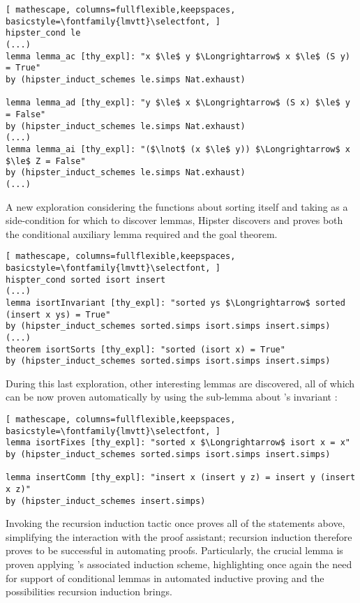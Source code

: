 \begin{lstlisting}[ mathescape, columns=fullflexible,keepspaces, basicstyle=\fontfamily{lmvtt}\selectfont, ]
hipster_cond le
(...)
lemma lemma_ac [thy_expl]: "x $\le$ y $\Longrightarrow$ x $\le$ (S y) = True"
by (hipster_induct_schemes le.simps Nat.exhaust)

lemma lemma_ad [thy_expl]: "y $\le$ x $\Longrightarrow$ (S x) $\le$ y = False"
by (hipster_induct_schemes le.simps Nat.exhaust)
(...)
lemma lemma_ai [thy_expl]: "($\lnot$ (x $\le$ y)) $\Longrightarrow$ x $\le$ Z = False"
by (hipster_induct_schemes le.simps Nat.exhaust)
(...)
\end{lstlisting}

A new exploration considering the functions about sorting itself and taking  as a side-condition for which to discover lemmas, Hipster discovers and proves both the conditional auxiliary lemma required and the goal theorem.

\begin{lstlisting}[ mathescape, columns=fullflexible,keepspaces, basicstyle=\fontfamily{lmvtt}\selectfont, ]
hispter_cond sorted isort insert
(...)
lemma isortInvariant [thy_expl]: "sorted ys $\Longrightarrow$ sorted (insert x ys) = True"
by (hipster_induct_schemes sorted.simps isort.simps insert.simps)
(...)
theorem isortSorts [thy_expl]: "sorted (isort x) = True"
by (hipster_induct_schemes sorted.simps isort.simps insert.simps)
\end{lstlisting}

During this last exploration, other interesting lemmas are discovered, all of which can be now proven automatically by using the sub-lemma about 's invariant :

\begin{lstlisting}[ mathescape, columns=fullflexible,keepspaces, basicstyle=\fontfamily{lmvtt}\selectfont, ]
lemma isortFixes [thy_expl]: "sorted x $\Longrightarrow$ isort x = x"
by (hipster_induct_schemes sorted.simps isort.simps insert.simps)

lemma insertComm [thy_expl]: "insert x (insert y z) = insert y (insert x z)"
by (hipster_induct_schemes insert.simps)
\end{lstlisting}

Invoking the recursion induction tactic  once proves all of the statements above, simplifying the interaction with the proof assistant; recursion induction therefore proves to be successful in automating proofs.
%
Particularly, the crucial lemma  is proven applying 's associated induction scheme, highlighting once again the need for support of conditional lemmas in automated inductive proving and the possibilities recursion induction brings.

